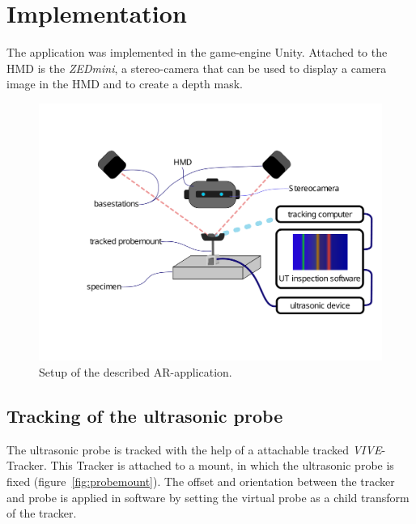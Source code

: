 \documentclass{VRARWorkshop}
\begin{document}
\section{Implementation}
The application was implemented in the game-engine Unity.
Attached to the HMD is the \textit{ZEDmini}, a stereo-camera that can be used to display a camera image in the HMD and to create a depth mask.

\cite{dorner_virtual_2013}

\begin{figure}[h!]
    \begin{center}
        \includegraphics[width=158mm]{images/Setup-ARUS}
        \caption{\label{fig:Setup} Setup of the described AR-application.}
    \end{center}
\end{figure}

\subsection{Tracking of the ultrasonic probe}
The ultrasonic probe is tracked with the help of a attachable tracked \textit{VIVE}-Tracker.
This Tracker is attached to a mount, in which the ultrasonic probe is fixed (figure~\ref{fig:probemount}).
The offset and orientation between the tracker and probe is applied in software by setting the virtual probe as a child transform of the tracker.
\end{document}
